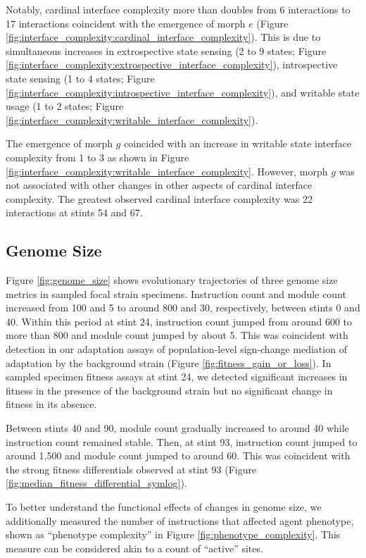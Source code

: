Notably, cardinal interface complexity more than doubles from 6 interactions to 17 interactions coincident with the emergence of morph $e$ (Figure \ref{fig:interface_complexity:cardinal_interface_complexity}).
This is due to simultaneous increases in extrospective state sensing (2 to 9 states; Figure \ref{fig:interface_complexity:extrospective_interface_complexity}), introspective state sensing (1 to 4 states; Figure \ref{fig:interface_complexity:introspective_interface_complexity}), and writable state usage (1 to 2 states; Figure \ref{fig:interface_complexity:writable_interface_complexity}).

The emergence of morph $g$ coincided with an increase in writable state interface complexity from 1 to 3 as shown in Figure \ref{fig:interface_complexity:writable_interface_complexity}.
However, morph $g$ was not associated with other changes in other aspects of cardinal interface complexity.
The greatest observed cardinal interface complexity was 22 interactions at stints 54 and 67.

\subsection{Genome Size}



Figure \ref{fig:genome_size} shows evolutionary trajectories of three genome size metrics in sampled focal strain specimens.
Instruction count and module count increased from 100 and 5 to around 800 and 30, respectively, between stints 0 and 40.
Within this period at stint 24, instruction count jumped from around 600 to more than 800 and module count jumped by about 5.
This was coincident with detection in our adaptation assays of population-level sign-change mediation of adaptation by the background strain (Figure \ref{fig:fitness_gain_or_loss}).
In sampled specimen fitness assays at stint 24, we detected significant increases in fitness in the presence of the background strain but no significant change in fitness in its absence.

Between stints 40 and 90, module count gradually increased to around 40 while instruction count remained stable.
Then, at stint 93, instruction count jumped to around 1,500 and module count jumped to around 60.
This was coincident with the strong fitness differentials observed at stint 93 (Figure \ref{fig:median_fitness_differential_symlog}).

To better understand the functional effects of changes in genome size, we additionally measured the number of instructions that affected agent phenotype, shown as ``phenotype complexity'' in Figure \ref{fig:phenotype_complexity}.
This measure can be considered akin to a count of ``active'' sites.

